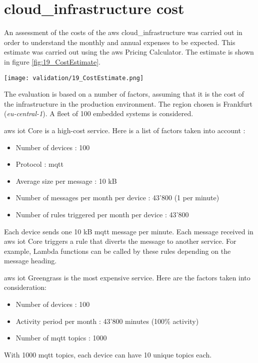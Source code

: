\section{\texorpdfstring{\Gls{cloud_infrastructure}}{} cost}

An assessment of the costs of the \gls{aws} \gls{cloud_infrastructure} was carried out in order to understand the monthly and annual expenses to be expected. This estimate was carried out using the \gls{aws} Pricing Calculator. The estimate is shown in figure \ref{fig:19_CostEstimate}.
\begin{center}
    \begingroup
    \texttt{[image: validation/19\_CostEstimate.png]}
    \label{fig:19_CostEstimate}
    \endgroup
\end{center}
The evaluation is based on a number of factors, assuming that it is the cost of the infrastructure in the production environment. The region chosen is Frankfurt (\textit{eu-central-1}). A fleet of 100 embedded systems is considered.

\gls{aws} \acrshort{iot} Core is a high-cost service. Here is a list of factors taken into account :
\begin{itemize}
    \item Number of devices : 100
    \item Protocol : \acrshort{mqtt}
    \item Average size per message : 10 kB
    \item Number of messages per month per device : 43'800 (1 per minute)
    \item Number of rules triggered per month per device : 43'800
\end{itemize}
Each device sends one 10 kB \acrshort{mqtt} message per minute. Each message received in \gls{aws} \acrshort{iot} Core triggers a rule that diverts the message to another service. For example, Lambda functions can be called by these rules depending on the message heading.

\gls{aws} \acrshort{iot} Greengrass is the most expensive service. Here are the factors taken into consideration:
\begin{itemize}
    \item Number of devices : 100
    \item Activity period per month : 43'800 minutes (100\% activity)
    \item Number of \acrshort{mqtt} topics : 1000
\end{itemize}
With 1000 \acrshort{mqtt} topics, each device can have 10 unique topics each.

